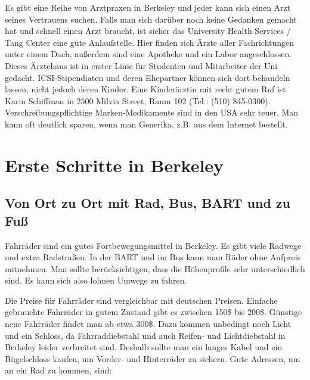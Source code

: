 \documentclass[a4paper]{scrreprt}
\begin{document}
Es gibt eine Reihe von Arztpraxen in Berkeley und jeder kann sich einen Arzt seines Vertrauens suchen. Falls man sich darüber noch keine Gedanken gemacht hat und schnell einen Arzt braucht, ist sicher das University Health Services / Tang Center eine gute Anlaufstelle. Hier finden sich Ärzte aller Fachrichtungen unter einem Dach, außerdem sind eine Apotheke und ein Labor angeschlossen. Dieses Ärztehaus ist in erster Linie für Studenten und Mitarbeiter der Uni gedacht. ICSI-Stipendiaten und deren Ehepartner können sich dort behandeln lassen, nicht jedoch deren Kinder.
Eine Kinderärztin mit recht gutem Ruf ist Karin Schiffman in 2500 Milvia Street, Raum 102 (Tel.: (510) 845-0300). Verschreibungspflichtige Marken-Medikamente sind in den USA sehr teuer. Man kann oft deutlich sparen, wenn man Generika, z.B. aus dem Internet bestellt.
 
\chapter{Erste Schritte in Berkeley}

\section{Von Ort zu Ort mit Rad, Bus, BART und zu Fuß}

Fahrräder sind ein gutes Fortbewegungsmittel in Berkeley. Es gibt
viele Radwege und extra Radstraßen. In der BART und im Bus kann man
Räder ohne Aufpreis mitnehmen. Man sollte berücksichtigen, dass die
Höhenprofile sehr unterschiedlich sind. Es kann sich also lohnen
Umwege zu fahren.

Die Preise für Fahrräder sind vergleichbar mit deutschen
Preisen. Einfache gebrauchte Fahrräder in gutem Zustand gibt es
zwischen 150\$ bis 200\$. Günstige neue Fahrräder findet man ab etwa
300\$. Dazu kommen unbedingt noch Licht und ein Schloss, da
Fahrraddiebstahl und auch Reifen- und Lichtdiebstahl in Berkeley
leider verbreitet sind. Deshalb sollte man ein langes Kabel und ein
Bügelschloss kaufen, um Vorder- und Hinterräder zu sichern. Gute
Adressen, um an ein Rad zu kommen, sind:
\end{document}
